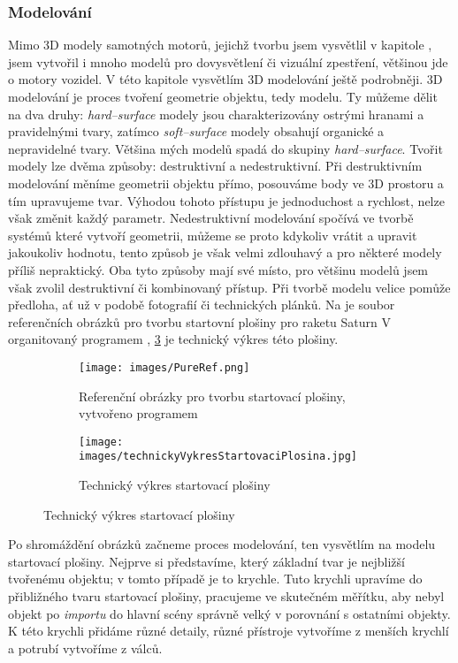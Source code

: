{\subsubsection{Modelování}
{Mimo 3D modely samotných motorů, jejichž tvorbu jsem vysvětlil v kapitole , jsem vytvořil i mnoho modelů pro dovysvětlení či vizuální zpestření, většinou jde o motory vozidel. V této kapitole vysvětlím 3D modelování ještě podrobněji.}\odst
{3D modelování je proces tvoření geometrie objektu, tedy modelu. Ty můžeme dělit na dva druhy: \textit{hard--surface} modely jsou charakterizovány ostrými hranami a pravidelnými tvary, zatímco \textit{soft--surface} modely obsahují organické a nepravidelné tvary. Většina mých modelů spadá do skupiny \textit{hard--surface}.}\odst
{Tvořit modely lze dvěma způsoby: destruktivní a nedestruktivní. Při destruktivním modelování měníme geometrii objektu přímo, posouváme body ve 3D prostoru a tím upravujeme tvar. Výhodou tohoto přístupu je jednoduchost a rychlost, nelze však změnit každý parametr. Nedestruktivní modelování spočívá ve tvorbě systémů které vytvoří geometrii, můžeme se proto kdykoliv vrátit a upravit jakoukoliv hodnotu, tento způsob je však velmi zdlouhavý a pro některé modely příliš nepraktický. Oba tyto způsoby mají své místo, pro většinu modelů jsem však zvolil destruktivní či kombinovaný přístup.}\odst
{Při tvorbě modelu velice pomůže předloha, ať už v podobě fotografií či technických plánků. Na  je soubor referenčních obrázků pro tvorbu startovní plošiny pro raketu Saturn V organitovaný programem , \ref{obr:predlohaVykres} je technický výkres této plošiny.}

\begin{figure}[H]
    \centering
    \begin{subfigure}{.7\textwidth}
        \centering
        \texttt{[image: images/PureRef.png]}
        \caption{Referenční obrázky pro tvorbu startovací plošiny, \\vytvořeno programem }
        \label{obr:predlohaFotky}
    \end{subfigure}%
    \begin{subfigure}{.3\textwidth}
        \centering
        \texttt{[image: images/technickyVykresStartovaciPlosina.jpg]}
        \caption{Technický výkres startovací plošiny}
        \label{obr:predlohaVykres}
    \end{subfigure}
\end{figure}

{Po shromáždění obrázků začneme proces modelování, ten vysvětlím na modelu startovací plošiny. Nejprve si představíme, který základní tvar je nejbližší tvořenému objektu; v tomto případě je to krychle. Tuto krychli upravíme do přibližného tvaru startovací plošiny, pracujeme ve skutečném měřítku, aby nebyl objekt po \textit{importu} do hlavní scény správně velký v porovnání s ostatními objekty. K této krychli přidáme různé detaily, různé přístroje vytvoříme z menších krychlí a potrubí vytvoříme z válců.}

}
